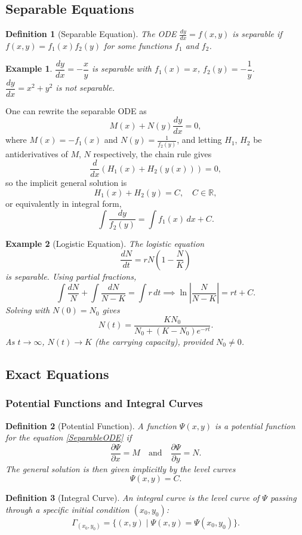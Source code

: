 \documentclass{article}
\newtheorem{definition}{Definition}
\newtheorem*{example}{Example}
\newcommand{\R}{\mathbb{R}}
\begin{document}
\subsection{Separable Equations}
\begin{definition}[Separable Equation]
    The ODE $\frac{dy}{dx} = f(x,y)$ is \emph{separable} if $f(x,y) = f_1(x)f_2(y)$ for some functions $f_1$ and $f_2$.
\end{definition}
\begin{example}
    $\dfrac{dy}{dx} = -\dfrac{x}{y}$ is separable with $f_1(x) = x$, $f_2(y) = -\dfrac{1}{y}$.\\
    $\dfrac{dy}{dx} = x^2 + y^2$ is not separable.
\end{example}
One can rewrite the separable ODE as
\begin{equation}
    \label{SeparableODE}
    M(x) + N(y)\frac{dy}{dx} = 0,
\end{equation}
where $M(x) = -f_1(x)$ and $N(y) = \frac{1}{f_2(y)}$, and letting $H_1$, $H_2$ be antiderivatives of $M$, $N$ respectively, the chain rule gives
\[\frac{d}{dx}(H_1(x) + H_2(y(x))) = 0,\]
so the implicit general solution is
\[H_1(x) + H_2(y) = C, \quad C \in \R,\]
or equivalently in integral form,
\[\int \frac{dy}{f_2(y)} = \int f_1(x)\,dx + C.\]
\begin{example}[Logistic Equation]
    The logistic equation
    \[\frac{dN}{dt} = rN\!\left(1 - \frac{N}{K}\right)\]
    is separable. Using partial fractions,
    \[\int\frac{dN}{N} + \int\frac{dN}{N-K} = \int r\,dt \implies \ln\left|\frac{N}{N-K}\right| = rt + C.\]
    Solving with $N(0) = N_0$ gives
    \[N(t) = \frac{KN_0}{N_0 + (K-N_0)e^{-rt}}.\]
    As $t\to\infty$, $N(t)\to K$ (the carrying capacity), provided $N_0 \neq 0$.
\end{example}

\subsection{Exact Equations}
\subsubsection{Potential Functions and Integral Curves}
\begin{definition}[Potential Function]
    A function $\Psi(x,y)$ is a potential function for the equation \eqref{SeparableODE} if
    \[\frac{\partial\Psi}{\partial x} = M \quad \text{and} \quad \frac{\partial\Psi}{\partial y} = N.\]
    The general solution is then given implicitly by the level curves
    \[\Psi(x,y) = C.\]
\end{definition}
\begin{definition}[Integral Curve]
    An integral curve is the level curve of $\Psi$ passing through a specific initial condition $(x_0,y_0)$:
    \[\Gamma_{(x_0,y_0)} = \{(x,y)\mid \Psi(x,y) = \Psi(x_0,y_0)\}.\]
\end{definition}
\end{document}

